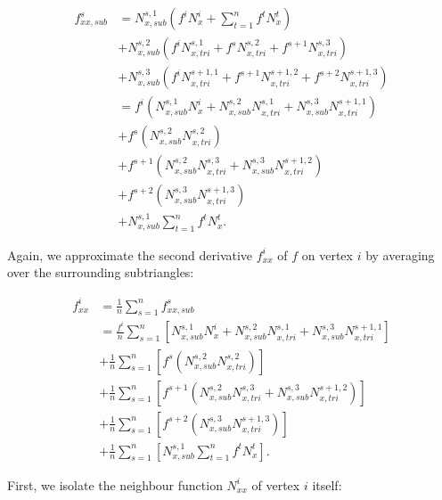 \documentclass{article}
\begin{document}
\begin{equation} \label{eq:disc_fxxsub3}
\begin{split}
f_{xx,sub}^s &= N_{x,sub}^{s,1} \left( f^i N_x^i + \sum_{t=1}^n f^t N_x^t \right) \\
     & + N_{x,sub}^{s,2} \left( f^i N_{x,tri}^{s,1} + f^s N_{x,tri}^{s,2} + f^{s+1} N_{x,tri}^{s,3} \right) \\ 
     & + N_{x,sub}^{s,3} \left( f^i N_{x,tri}^{s+1,1} + f^{s+1} N_{x,tri}^{s+1,2} + f^{s+2} N_{x,tri}^{s+1,3} \right) \\
     &= f^i \left( N_{x,sub}^{s,1} N_x^i + N_{x,sub}^{s,2} N_{x,tri}^{s,1} + N_{x,sub}^{s,3} N_{x,tri}^{s+1,1} \right) \\
     & + f^s \left( N_{x,sub}^{s,2} N_{x,tri}^{s,2} \right) \\
     & + f^{s+1} \left( N_{x,sub}^{s,2} N_{x,tri}^{s,3} + N_{x,sub}^{s,3} N_{x,tri}^{s+1,2} \right) \\
     & + f^{s+2} \left( N_{x,sub}^{s,3} N_{x,tri}^{s+1,3} \right) \\
     & + N_{x,sub}^{s,1} \sum_{t=1}^n f^t N_x^t.
\end{split}
\end{equation}

Again, we approximate the second derivative $f_{xx}^i$ of $f$ on vertex $i$ by averaging over the surrounding subtriangles:

\begin{equation} \label{eq:disc_fxxi}
\begin{split}
f_{xx}^i &= \frac{1}{n} \sum_{s=1}^n f_{xx,sub}^s \\
     &= \frac{f^i}{n} \sum_{s=1}^n \left[ N_{x,sub}^{s,1} N_x^i + N_{x,sub}^{s,2} N_{x,tri}^{s,1} + N_{x,sub}^{s,3} N_{x,tri}^{s+1,1} \right] \\
     & + \frac{1}{n} \sum_{s=1}^n \left[ f^s \left( N_{x,sub}^{s,2} N_{x,tri}^{s,2} \right) \right] \\
     & + \frac{1}{n} \sum_{s=1}^n \left[ f^{s+1} \left( N_{x,sub}^{s,2} N_{x,tri}^{s,3} + N_{x,sub}^{s,3} N_{x,tri}^{s+1,2} \right) \right] \\
     & + \frac{1}{n} \sum_{s=1}^n \left[ f^{s+2} \left( N_{x,sub}^{s,3} N_{x,tri}^{s+1,3} \right) \right] \\
     & + \frac{1}{n} \sum_{s=1}^n \left[ N_{x,sub}^{s,1} \sum_{t=1}^n f^t N_x^t \right].
\end{split}
\end{equation}

First, we isolate the neighbour function $N_{xx}^i$  of vertex $i$ itself:
\end{document}
